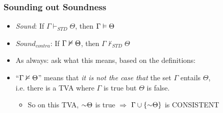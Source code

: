 \begin{frame}
\frametitle{Sounding out Soundness}

\begin{itemize}[<+->]

\item \emph{Sound}: If $\Gamma \vdash_{STD} \Theta$, then $\Gamma \vDash \Theta$

\item \emph{$Sound_{contra}$}: If $\Gamma \nvDash \Theta$, then $\Gamma \nvdash_{STD} \Theta$ 

\item As always: ask what this means, based on the definitions:

\item ``$\Gamma \nvDash \Theta$'' means that \textit{it is not the case that} the set $\Gamma$ entails $\Theta$, \\ i.e. there is a TVA where $\Gamma$ is true but $\Theta$ is false. 

\bigskip

\begin{itemize}

\item So on this TVA, $\enot \Theta$ is true $\Rightarrow$ $\Gamma \cup \{\enot \Theta \}$ is \textcolor{OGlyallpink}{CONSISTENT}

\end{itemize}


\end{itemize}
\end{frame}


